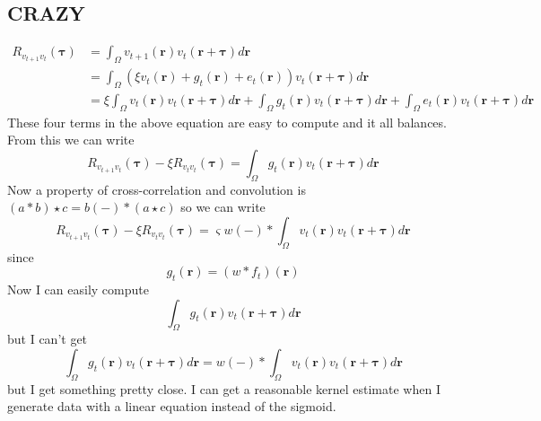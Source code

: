 \documentclass[]{article}
\begin{document}
\subsection*{CRAZY}
\begin{align}
	R_{v_{t+1}v_t}(\boldsymbol{\tau}) &= \int_{\Omega} v_{t+1}(\mathbf{r}) v_t(\mathbf{r}+\boldsymbol{\tau}) d\mathbf{r} \\
	&= \int_{\Omega} \left(\xi v_t(\mathbf{r}) + g_t(\mathbf{r}) + e_t(\mathbf{r})\right) v_t(\mathbf{r}+\boldsymbol{\tau}) d\mathbf{r} \\
	&= \xi \int_{\Omega} v_t(\mathbf{r}) v_t(\mathbf{r}+\boldsymbol{\tau})d\mathbf{r} + \int_{\Omega}g_t(\mathbf{r})v_t(\mathbf{r}+\boldsymbol{\tau}) d\mathbf{r} + \int_{\Omega} e_t(\mathbf{r})v_t(\mathbf{r}+\boldsymbol{\tau})d\mathbf{r}
\end{align}
These four terms in the above equation are easy to compute and it all balances. From this we can write
\begin{equation}
	R_{v_{t+1}v_t}(\boldsymbol{\tau}) - \xi R_{v_tv_t}(\boldsymbol{\tau}) = \int_{\Omega}g_t(\mathbf{r})v_t(\mathbf{r}+\boldsymbol{\tau}) d\mathbf{r}
\end{equation}
Now a property of cross-correlation and convolution is $(a \ast b) \star c = b(-)\ast(a \star c)$ so we can write
\begin{equation}
	R_{v_{t+1}v_t}(\boldsymbol{\tau}) - \xi R_{v_tv_t}(\boldsymbol{\tau}) = \varsigma w(-) \ast \int_{\Omega} v_t(\mathbf{r}) v_t(\mathbf{r}+\boldsymbol{\tau})d\mathbf{r}
\end{equation}
since
\begin{equation}
	g_t(\mathbf{r}) = (w \ast f_t)(\mathbf{r})
\end{equation}
Now I can easily compute
\begin{equation}
	\int_{\Omega}g_t(\mathbf{r})v_t(\mathbf{r}+\boldsymbol{\tau}) d\mathbf{r}
\end{equation}
but I can't get
\begin{equation}
	\int_{\Omega}g_t(\mathbf{r})v_t(\mathbf{r}+\boldsymbol{\tau}) d\mathbf{r} = w(-) \ast \int_{\Omega} v_t(\mathbf{r}) v_t(\mathbf{r}+\boldsymbol{\tau})d\mathbf{r}
\end{equation}
but I get something pretty close. I can get a reasonable kernel estimate when I generate data with a linear equation instead of the sigmoid. 
\end{document}
